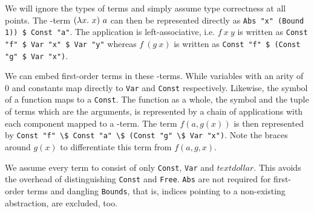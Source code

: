 We will ignore the types of terms and simply assume type correctness at all points. The \lam -term $(\lam x.\ x)\ a$ can then be represented directly as \verb!Abs "x" (Bound 1)) $ Const "a"!. The application is left-associative, i.e. $f\ x\ y$ is written as \verb!Const "f" $ Var "x" $ Var "y"! whereas $f\ (g\ x)$ is written as \verb!Const "f" $ (Const "g" $ Var "x")!.

We can embed first-order terms in these \lam -terms. While variables with an arity of $0$ and constants map directly to \verb!Var! and \verb!Const! respectively. Likewise, the symbol of a function maps to a \verb!Const!. The function as a whole, the symbol and the tuple of terms which are the arguments, is represented by a chain of applications with each component mapped to a \lam -term. The term $f(a,g(x))$ is then represented by \verb!Const "f" \$ Const "a" \$ (Const "g" \$ Var "x")!. Note the braces around $g(x)$ to differentiate this term from $f(a,g,x)$.

We assume every term to consist of only \verb!Const!, \verb!Var! and $textdollar$. This avoids the overhead of distinguishing \verb!Const! and \verb!Free!. \verb!Abs! are not required for first-order terms and dangling \verb!Bounds!, that is, indices pointing to a non-existing abstraction, are excluded, too.


